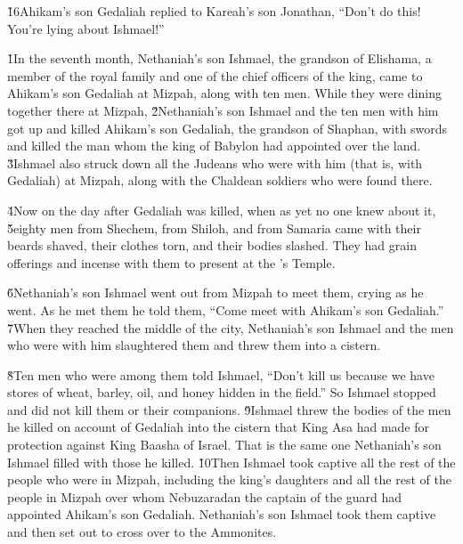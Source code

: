 \v{16}Ahikam's son Gedaliah replied to Kareah's son Jonathan, ``Don't do this! You're lying about Ishmael!''

\v{1}In the seventh month, Nethaniah's son Ishmael, the grandson of Elishama, a member of the royal family and one of the chief officers of the king, came to Ahikam's son Gedaliah at Mizpah, along with ten men. While they were dining together there at Mizpah, \v{2}Nethaniah's son Ishmael and the ten men with him got up and killed Ahikam's son Gedaliah, the grandson of Shaphan, with swords and killed the man whom the king of Babylon had appointed over the land. \v{3}Ishmael also struck down all the Judeans who were with him (that is, with Gedaliah) at Mizpah, along with the Chaldean soldiers who were found there.

\v{4}Now on the day after Gedaliah was killed, when as yet no one knew about it, \v{5}eighty men from Shechem, from Shiloh, and from Samaria came with their beards shaved, their clothes torn, and their bodies slashed. They had grain offerings and incense with them to present at the 's Temple.

\v{6}Nethaniah's son Ishmael went out from Mizpah to meet them, crying as he went. As he met them he told them, ``Come meet with Ahikam's son Gedaliah.'' \v{7}When they reached the middle of the city, Nethaniah's son Ishmael and the men who were with him slaughtered them and threw them into a cistern.

\v{8}Ten men who were among them told Ishmael, ``Don't kill us because we have stores of wheat, barley, oil, and honey hidden in the field.'' So Ishmael stopped and did not kill them or their companions. \v{9}Ishmael threw the bodies of the men he killed on account of Gedaliah into the cistern that King Asa had made for protection against King Baasha of Israel. That is the same one Nethaniah's son Ishmael filled with those he killed. \v{10}Then Ishmael took captive all the rest of the people who were in Mizpah, including the king's daughters and all the rest of the people in Mizpah over whom Nebuzaradan the captain of the guard had appointed Ahikam's son Gedaliah. Nethaniah's son Ishmael took them captive and then set out to cross over to the Ammonites.


